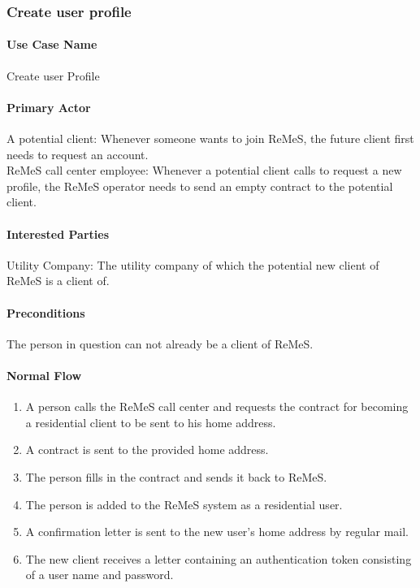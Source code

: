 \subsubsection{Create user profile}

\paragraph{Use Case Name}
Create user Profile
\paragraph{Primary Actor}
A potential client: Whenever someone wants to join ReMeS, the future client first needs to request an account.\\
ReMeS call center employee: Whenever a potential client calls to request a new profile, the ReMeS operator needs to send an empty contract to the potential client.
\paragraph{Interested Parties}
Utility Company: The utility company of which the potential new client of ReMeS is a client of.
\paragraph{Preconditions}
The person in question can not already be a client of ReMeS.
\paragraph{Normal Flow}
\begin{enumerate}
	\item A person calls the ReMeS call center and requests the contract for becoming a residential client to be sent to his
	home address.
	\item A contract is sent to the provided home address.
	\item The person fills in the contract and sends it back to ReMeS.
	\item The person is added to the ReMeS system as a residential user.
	\item A confirmation letter is sent to the new user's home address by regular mail. 
	\item The new client receives a letter containing an authentication token consisting of a user name and password. 
\end{enumerate}

